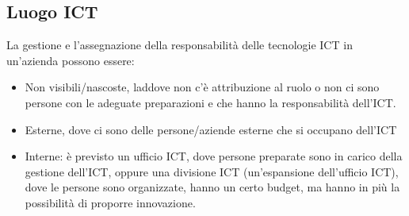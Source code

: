 \subsection{Luogo ICT}
La gestione e l'assegnazione della responsabilit\`a delle tecnologie ICT in un'azienda possono essere:
\begin{itemize}
	\item Non visibili/nascoste, laddove non c'\`e attribuzione al ruolo o non ci sono persone con le adeguate preparazioni e che hanno la responsabilit\`a dell'ICT.
	\item Esterne, dove ci sono delle persone/aziende esterne che si occupano dell'ICT
	\item Interne: \`e previsto un ufficio ICT, dove persone preparate sono in carico della gestione dell'ICT, oppure una divisione ICT (un'espansione dell'ufficio ICT), dove le persone sono organizzate, hanno un certo budget, ma hanno in pi\`u la possibilit\`a di proporre innovazione.
\end{itemize}
